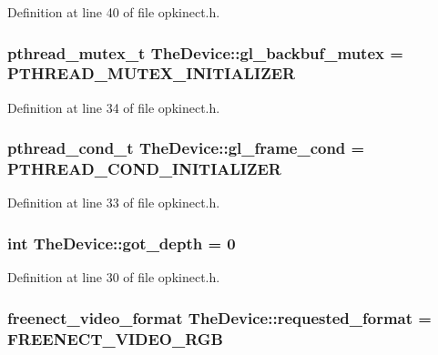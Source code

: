 Definition at line 40 of file opkinect.\+h.

\hypertarget{class_the_device_a4c323578c55eb1579d502ac00a646f48}{
\subsubsection[{gl\+\_\+backbuf\+\_\+mutex}]{\setlength{\rightskip}{0pt plus 5cm}pthread\+\_\+mutex\+\_\+t The\+Device\+::gl\+\_\+backbuf\+\_\+mutex = P\+T\+H\+R\+E\+A\+D\+\_\+\+M\+U\+T\+E\+X\+\_\+\+I\+N\+I\+T\+I\+A\+L\+I\+Z\+E\+R\hspace{0.3cm}{\ttfamily [static]}}}\label{class_the_device_a4c323578c55eb1579d502ac00a646f48}


Definition at line 34 of file opkinect.\+h.

\hypertarget{class_the_device_abe546632e82af214d61db8d9d04a288d}{
\subsubsection[{gl\+\_\+frame\+\_\+cond}]{\setlength{\rightskip}{0pt plus 5cm}pthread\+\_\+cond\+\_\+t The\+Device\+::gl\+\_\+frame\+\_\+cond = P\+T\+H\+R\+E\+A\+D\+\_\+\+C\+O\+N\+D\+\_\+\+I\+N\+I\+T\+I\+A\+L\+I\+Z\+E\+R\hspace{0.3cm}{\ttfamily [static]}}}\label{class_the_device_abe546632e82af214d61db8d9d04a288d}


Definition at line 33 of file opkinect.\+h.

\hypertarget{class_the_device_a998f82ad80842ecb61506eb373290a6e}{
\subsubsection[{got\+\_\+depth}]{\setlength{\rightskip}{0pt plus 5cm}int The\+Device\+::got\+\_\+depth = 0\hspace{0.3cm}{\ttfamily [static]}}}\label{class_the_device_a998f82ad80842ecb61506eb373290a6e}


Definition at line 30 of file opkinect.\+h.

\hypertarget{class_the_device_a36b600c96ef49a9d585e641c034fee40}{
\subsubsection[{requested\+\_\+format}]{\setlength{\rightskip}{0pt plus 5cm}freenect\+\_\+video\+\_\+format The\+Device\+::requested\+\_\+format = F\+R\+E\+E\+N\+E\+C\+T\+\_\+\+V\+I\+D\+E\+O\+\_\+\+R\+G\+B\hspace{0.3cm}{\ttfamily [static]}}}\label{class_the_device_a36b600c96ef49a9d585e641c034fee40}


